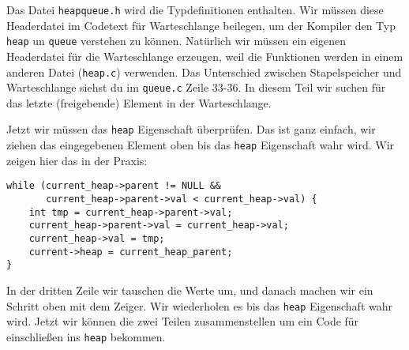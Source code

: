 Das Datei \texttt{heapqueue.h} wird die Typdefinitionen enthalten. Wir müssen
diese Headerdatei im Codetext für Warteschlange beilegen, um der Kompiler
den Typ \texttt{heap} un \texttt{queue} verstehen zu können. Natürlich wir müssen 
ein eigenen Headerdatei für die Warteschlange erzeugen, weil die Funktionen 
werden in einem anderen Datei (\texttt{heap.c}) verwenden. Das Unterschied
zwischen Stapelspeicher und Warteschlange siehst du im \texttt{queue.c} Zeile 33-36.
In diesem Teil wir suchen für das letzte (freigebende) Element in
der Warteschlange.

Jetzt wir müssen das \texttt{heap} Eigenschaft überprüfen. Das ist ganz einfach, 
wir ziehen das eingegebenen Element oben bis das \texttt{heap} Eigenschaft wahr wird.
Wir zeigen hier das in der Praxis:
\begin{lstlisting}
while (current_heap->parent != NULL &&
       current_heap->parent->val < current_heap->val) {
    int tmp = current_heap->parent->val;
    current_heap->parent->val = current_heap->val;
    current_heap->val = tmp;
    current->heap = current_heap_parent;
}
\end{lstlisting} 
In der dritten Zeile wir tauschen die Werte um, und danach machen
wir ein Schritt oben mit dem Zeiger. Wir wiederholen es bis
das \texttt{heap} Eigenschaft wahr wird. Jetzt wir können die zwei Teilen
zusammenstellen um ein Code für einschließen ins \texttt{heap} bekommen.

